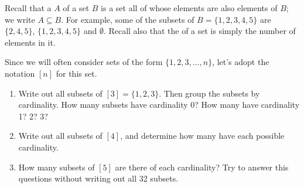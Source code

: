 \documentclass{book}
\begin{document}
\setcounter{project}{65}
\addtocounter{project}{-1}
\begin{activity}[]\label{activity-58}
\hypertarget{p-516}{}%
Recall that a  \(A\) of a set \(B\) is a set all of whose elements are also elements of \(B\); we write \(A \subseteq B\).  For example, some of the subsets of \(B = \{1,2,3,4,5\}\) are \(\{2,4,5\}\), \(\{1,2,3,4,5\}\) and \(\emptyset\).  Recall also that the  of a set is simply the number of elements in it.%
\par
\hypertarget{p-517}{}%
Since we will often consider sets of the form \(\{1,2,3,\ldots,n\}\), let's adopt the notation \([n]\) for this set.%
\begin{enumerate}[font=\bfseries,label=(\alph*),ref=\alph*]
\item\label{task-82} \hypertarget{p-518}{}%
Write out all subsets of \([3] = \{1,2,3\}\).  Then group the subsets by cardinality.  How many subsets have cardinality 0?  How many have cardinality 1?  2? 3?%
\item\label{task-83} \hypertarget{p-519}{}%
Write out all subsets of \([4]\), and determine how many have each possible cardinality.%
\item\label{task-84} \hypertarget{p-520}{}%
How many subsets of \([5]\) are there of each cardinality?  Try to answer this questions without writing out all 32 subsets.%
\end{enumerate}
\end{activity}
\end{document}
